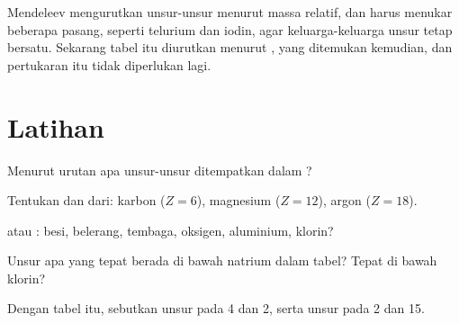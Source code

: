 \begin{remark}\label{rem:g9:periodic-table-first-look:order}
Mendeleev mengurutkan unsur-unsur menurut massa  relatif, dan harus
menukar beberapa pasang, seperti telurium dan iodin, agar keluarga-keluarga
unsur tetap bersatu. Sekarang tabel itu diurutkan menurut ,
yang ditemukan kemudian, dan pertukaran itu tidak diperlukan lagi.
\end{remark}

\section{Latihan}

\begin{exercise}[$\star$]\label{exo:g9:periodic-table-first-look:1}
Menurut urutan apa unsur-unsur ditempatkan dalam ?
\end{exercise}

\begin{exercise}[$\star$]\label{exo:g9:periodic-table-first-look:2}
Tentukan  dan  dari: karbon ($Z = 6$), magnesium
($Z = 12$), argon ($Z = 18$).
\end{exercise}

\begin{exercise}[$\star$]\label{exo:g9:periodic-table-first-look:3}
 atau : besi, belerang, tembaga, oksigen, aluminium, klorin?
\end{exercise}

\begin{exercise}[$\star$]\label{exo:g9:periodic-table-first-look:4}
Unsur apa yang tepat berada di bawah natrium dalam tabel? Tepat di bawah
klorin?
\end{exercise}

\begin{exercise}[$\star\star$]\label{exo:g9:periodic-table-first-look:5}
Dengan tabel itu, sebutkan unsur pada  4 dan  2, serta
unsur pada  2 dan  15.
\end{exercise}

